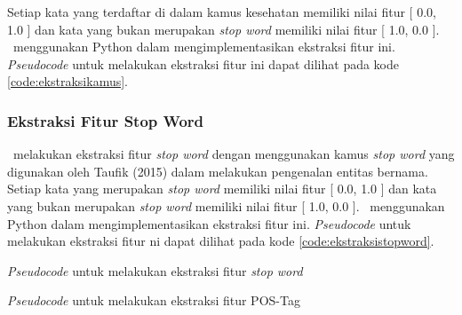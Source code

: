 Setiap kata yang terdaftar di dalam kamus kesehatan memiliki nilai fitur [ 0.0, 1.0 ] dan kata yang bukan merupakan \textit{stop word} memiliki nilai fitur [ 1.0, 0.0 ]. \Saya~menggunakan Python dalam mengimplementasikan ekstraksi fitur ini. \textit{Pseudocode} untuk melakukan ekstraksi fitur ini dapat dilihat pada kode \ref{code:ekstraksikamus}.


\subsubsection{Ekstraksi Fitur Stop Word}
\Saya~melakukan ekstraksi fitur \textit{stop word} dengan menggunakan kamus \textit{stop word} yang digunakan oleh Taufik (2015) dalam melakukan pengenalan entitas bernama. Setiap kata yang merupakan \textit{stop word} memiliki nilai fitur [ 0.0, 1.0 ] dan kata yang bukan merupakan \textit{stop word} memiliki nilai fitur [ 1.0, 0.0 ]. \Saya~menggunakan Python dalam mengimplementasikan ekstraksi fitur ini. \textit{Pseudocode} untuk melakukan ekstraksi fitur ni dapat dilihat pada kode \ref{code:ekstraksistopword}.

\begin{kode}
	
	
	
	\caption{\textit{Pseudocode} untuk melakukan ekstraksi fitur \textit{stop word}}
	\label{code:ekstraksistopword}	
\end{kode}

\begin{kode}
	
	
	\caption{\textit{Pseudocode} untuk melakukan ekstraksi fitur POS-Tag}
	\label{code:ekstraksipostag}
\end{kode}

